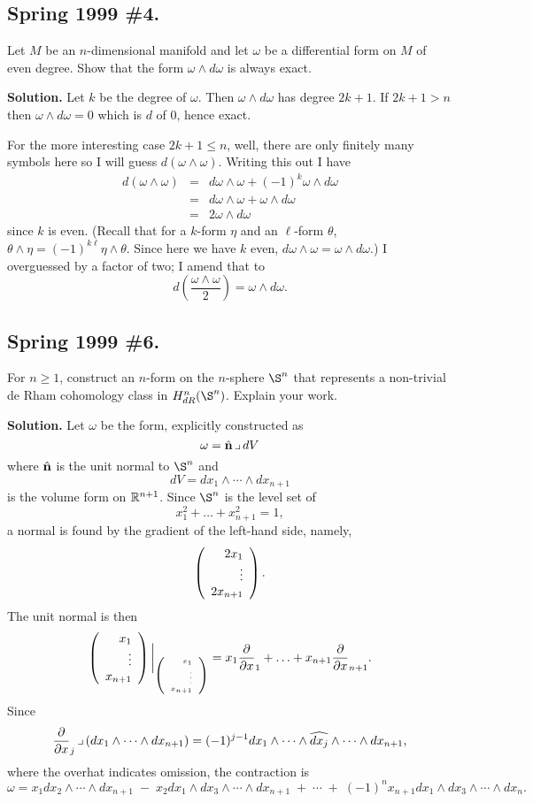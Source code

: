 \documentclass[10pt]{article}
\numberwithin{equation}{subsection}
\begin{document}
\subsection{Spring 1999 \#4.}

Let $M$ be an $n$-dimensional manifold and let $\omega$ be a differential form
on $M$ of even degree.  Show that the form $\omega \wedge d\omega$ is always
exact.

\textbf{Solution.}  Let $k$ be the degree of $\omega$.  Then $\omega \wedge
d\omega$ has degree $2k+1$.  If $2k+1 > n$ then $\omega\wedge d\omega = 0$
which is $d$ of 0, hence exact.

For the more interesting case $2k+1 \le n$, well, there are only finitely many
symbols here so I will guess $d(\omega\wedge\omega)$.  Writing this out I have
\begin{eqnarray*}
	d(\omega \wedge \omega) &=& d\omega \wedge \omega + (-1)^k \omega \wedge d\omega \\
	&=& d\omega \wedge \omega + \omega \wedge d\omega \\
	&=& 2 \omega \wedge d\omega
\end{eqnarray*}
since $k$ is even.  (Recall that for a $k$-form $\eta$ and an $\ell$-form
$\theta$, $\theta\wedge\eta = (-1)^{k\ell} \eta\wedge\theta$.  Since here we
have $k$ even, $d\omega\wedge\omega=\omega\wedge d\omega$.)  I overguessed by a
factor of two; I amend that to
$$
	d\left(\frac{\omega\wedge\omega}{2}\right) = \omega\wedge d\omega.
$$

\subsection{Spring 1999 \#6.}

For $n \ge 1$, construct an $n$-form on the $n$-sphere $\S^n$ that represents a
non-trivial de Rham cohomology class in $H^n_{dR}(\S^n)$.  Explain your work.

\textbf{Solution.}  Let $\omega$ be the form, explicitly constructed as
$$
	\omega = \hat{\mathbf{n}} \,\lrcorner\, dV
$$
where $\hat{\mathbf{n}}$ is the unit normal to $\S^n$ and
$$
	dV=dx_1 \wedge \cdots \wedge dx_{n+1}
$$
is the volume form on $\mathbb{R}^{n+1}$.  Since $\S^n$ is the level set of
$$
	x_1^2 + \ldots + x_{n+1}^2 = 1,
$$
a normal is found by the gradient of the left-hand side, namely,
$$
	\left(\begin{array}{r} 2 x_1 \\ \vdots \\ 2 x_{n+1}\end{array}\right).
$$
The unit normal is then
$$
	\left(\begin{array}{r} x_1 \\ \vdots \\ x_{n+1}\end{array}\right)\bigg|_{\tiny{\left(\begin{array}{r} x_1 \\ \vdots \\ x_{n+1}\end{array}\right)}}
	= x_1 \frac{\partial}{\partial x}_1 + \ldots + x_{n+1} \frac{\partial}{\partial x}_{n+1}.
$$
Since
$$
	\frac{\partial}{\partial x}_j \,\lrcorner\, (dx_1 \wedge \cdots \wedge dx_{n+1})
	= (-1)^{j-1}
	dx_1 \wedge \cdots \wedge \widehat{dx_j} \wedge\cdots \wedge dx_{n+1},
$$
where the overhat indicates omission, the contraction is
$$
	\omega = 
	x_1 dx_2 \wedge\cdots\wedge dx_{n+1}
	\;-\; x_2 dx_1 \wedge dx_3 \wedge \cdots\wedge dx_{n+1}
	\;+\; \cdots
	\;+\; (-1)^{n}
	x_{n+1} dx_1 \wedge dx_3 \wedge \cdots\wedge dx_n.
$$
\end{document}
